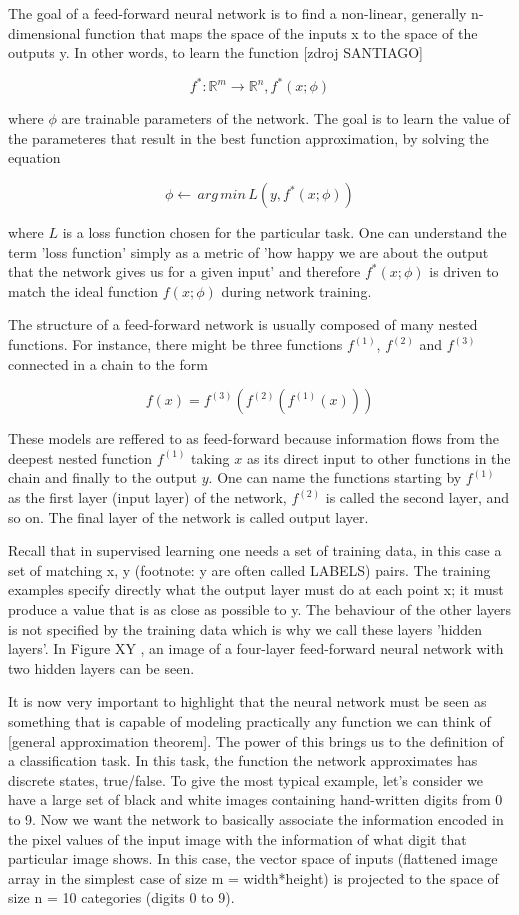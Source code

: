 The goal of a feed-forward neural network is to find a non-linear, generally n-dimensional function that maps the space of the inputs x to the space of the outputs y. In other words, to learn the function [zdroj SANTIAGO]

$$ f^*: \mathbb{R}^m \rightarrow \mathbb{R}^n, f^*(x;\phi) $$

where $ \phi $ are trainable parameters of the network. The goal is to learn the value of the parameteres that result in the best function approximation, by solving the equation

$$ \phi \leftarrow \, arg \, min \, L(y, f^*(x;\phi)) $$

where $ L $ is a loss function chosen for the particular task. One can understand the term 'loss function' simply as a metric of 'how happy we are about the output that the network gives us for a given input' and therefore $f^*(x;\phi)$ is driven to match the ideal function $f(x;\phi)$ during network training. 

The structure of a feed-forward network is usually composed of many nested functions. For instance, there might be three functions $f^{(1)}$, $f^{(2)}$ and $f^{(3)}$ connected in a chain to the form

$$ f(x) = f^{(3)}(f^{(2)}(f^{(1)}(x))) $$

These models are reffered to as feed-forward because information flows from the deepest nested function $f^{(1)}$ taking $ x $ as its direct input to other functions in the chain and finally to the output $ y $. One can name the functions starting by $f^{(1)}$ as the first layer (input layer) of the network, $f^{(2)}$ is called the second layer, and so on. The final layer of the network is called output layer. 

Recall that in supervised learning one needs a set of training data, in this case a set of matching x, y (footnote: y are often called LABELS) pairs. The training examples specify directly what the output layer must do at each point x; it must produce a value that is as close as possible to y. The behaviour of the other layers is not specified by the training data which is why we call these layers 'hidden layers'. In Figure XY , an image of a four-layer feed-forward neural network with two hidden layers can be seen.

It is now very important to highlight that the neural network must be seen as something that is capable of modeling practically any function we can think of [general approximation theorem]. The power of this brings us to the definition of a classification task. In this task, the function the network approximates has discrete states, true/false. To give the most typical example, let's consider we have a large set of black and white images containing hand-written digits from 0 to 9. Now we want the network to basically associate the information encoded in the pixel values of the input image with the information of what digit that particular image shows. In this case, the vector space of inputs (flattened image array in the simplest case of size m = width*height) is projected to the space of size n = 10 categories (digits 0 to 9). 

